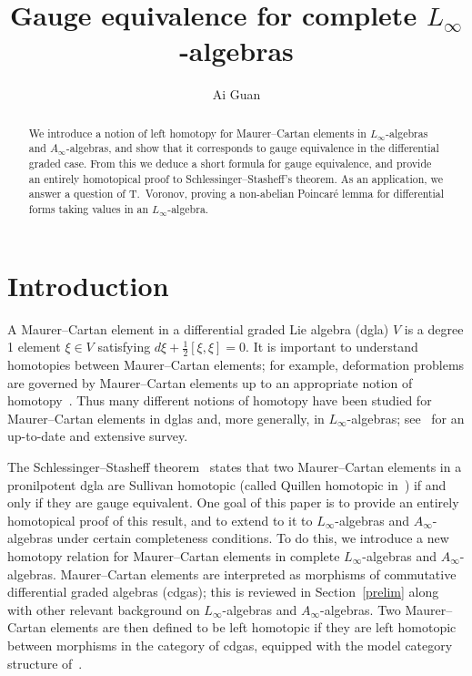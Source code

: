 \documentclass[a4paper,reqno]{amsart}
\title{Gauge equivalence for complete $L_{\infty}$-algebras}
\author{Ai Guan}
\theoremstyle{plain}
\theoremstyle{definition}
\theoremstyle{remark}
\begin{document}
\begin{abstract}
  We introduce a notion of left homotopy for Maurer--Cartan elements in $L_{\infty}$-algebras and $A_{\infty}$-algebras, and show that it corresponds to gauge equivalence in the differential graded case.  
  From this we deduce a short formula for gauge equivalence, and provide an entirely homotopical proof to Schlessinger--Stasheff's theorem. 
  As an application, we answer a question of T.~Voronov, proving a non-abelian Poincar\'e lemma for differential forms taking values in an $L_{\infty}$-algebra.
\end{abstract}

\maketitle


\section{Introduction}

A Maurer--Cartan element in a differential graded Lie algebra (dgla) $V$ is a degree 1 element $\xi \in V$ satisfying $d\xi + \frac{1}{2}[\xi,\xi]=0$.
It is important to understand homotopies between Maurer--Cartan elements; for example, deformation problems are governed by Maurer--Cartan elements up to an appropriate notion of homotopy~\cite{ss,man99}.
Thus many different notions of homotopy have been studied for Maurer--Cartan elements in dglas and, more generally, in $L_{\infty}$-algebras; see~\cite{dp16} for an up-to-date and extensive survey. 

The Schlessinger--Stasheff theorem~\cite{ss} states that two Maurer--Cartan elements in a pronilpotent dgla are Sullivan homotopic (called Quillen homotopic in~\cite{dp16}) if and only if they are gauge equivalent.
One goal of this paper is to provide an entirely homotopical proof of this result, and to extend to it to $L_{\infty}$-algebras and $A_{\infty}$-algebras under certain completeness conditions.
To do this, we introduce a new homotopy relation for Maurer--Cartan elements in complete $L_{\infty}$-algebras and $A_{\infty}$-algebras. 
Maurer--Cartan elements are interpreted as morphisms of commutative differential graded algebras (cdgas); this is reviewed in Section~\ref{prelim} along with other relevant background on $L_{\infty}$-algebras and $A_{\infty}$-algebras. 
Two Maurer--Cartan elements are then defined to be left homotopic if they are left homotopic between morphisms in the category of cdgas, equipped with the model category structure of~\cite{hin97}.
\end{document}
